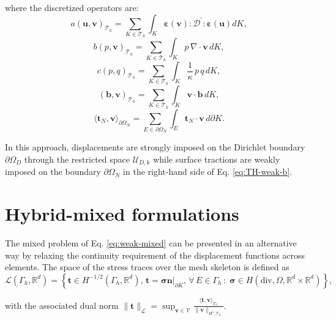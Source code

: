\documentclass[english,11pt,3p,number,sort&compress]{elsarticle}
\begin{document}
\noindent where the discretized operators are:
\begin{equation*}
	a\left(\bm{u},\bm{v}\right)_{\mathcal{T}_h} = \sum_{K \in \mathcal{T}_h} \int_{K} \bm{\varepsilon}(\bm{v}) : \mathcal{D}^{'} : \bm{\varepsilon}(\bm{u}) dK ,
\end{equation*}
\begin{equation*}
	b\left(p, \bm{v}\right)_{\mathcal{T}_h} = \sum_{K \in \mathcal{T}_h} \int_{K} p \,\nabla \cdot \bm{v} \, dK ,
\end{equation*}
\begin{equation*}
	c\left(p,q \right)_{\mathcal{T}_h} = \sum_{K \in \mathcal{T}_h} \int_{K} \frac{1}{\kappa} \,p \,q \, dK ,
\end{equation*}
\begin{equation*}
	\left(\bm{b},\bm{v}\right)_{\mathcal{T}_h} = \sum_{K \in \mathcal{T}_h} \int_{K} \bm{v} \cdot \bm{b} \, dK ,
\end{equation*}
\begin{equation*}
	\langle\bm{t}_N,\bm{v}\rangle_{\partial\Omega_N} = \sum_{E \in \partial\Omega_N} \int_{E} \bm{t}_N \cdot \bm{v} \, d\partial K .
\end{equation*}

In this approach, displacements are strongly imposed on the Dirichlet boundary $\partial \Omega_D$ through the restricted space $\mathcal{U}_{D,k}$ while surface tractions are weakly imposed on the boundary $\partial \Omega_N$ in the right-hand side of Eq. \eqref{eq:TH-weak-b}.

\section{Hybrid-mixed formulations} \label{sec:hybrid-mixed}

The mixed problem of Eq. \eqref{eq:weak-mixed} can be presented in an alternative way by relaxing the continuity requirement of the displacement functions across elements. The space of the stress traces over the mesh skeleton is defined as
\begin{equation}
	\label{eq:space-traction}
	\mathcal{L}(\Gamma_h,\mathbb{R}^d) = \left\{\bm{t} \in H^{-1/2}(\Gamma_h,\mathbb{R}^d), \, \bm{t}=\bm{\sigma}\bm{n}\lvert_{\partial K}, \, \forall \, E \in \Gamma_h ~:~\bm{\sigma} \in H(\text{div},\Omega,\mathbb{R}^d \times \mathbb{R}^d) \right\},
\end{equation}

\noindent with the associated dual norm $\lVert\bm{t}\rVert_{\mathcal{L}}=\sup_{\bm{v}\in\mathcal{V}}\frac{\langle\bm{t},\bm{v} \rangle_{\Gamma_h}}{\lVert\bm{v}\rVert_{H^1,\mathcal{T}_h}}$.
\end{document}
